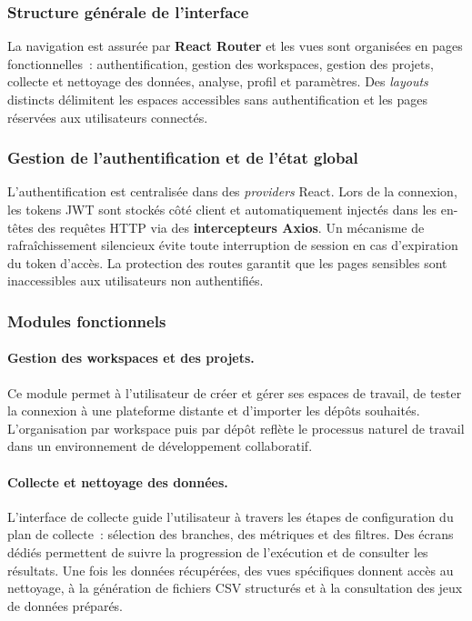 \subsubsection{Structure générale de l'interface}

La navigation est assurée par \textbf{React Router} et les vues sont organisées en pages
fonctionnelles~: authentification, gestion des workspaces, gestion des projets, collecte et
nettoyage des données, analyse, profil et paramètres. Des \textit{layouts} distincts délimitent
les espaces accessibles sans authentification et les pages réservées aux utilisateurs connectés.

\subsubsection{Gestion de l'authentification et de l'état global}

L'authentification est centralisée dans des \textit{providers} React. Lors de la connexion, les
tokens JWT sont stockés côté client et automatiquement injectés dans les en-têtes des requêtes
HTTP via des \textbf{intercepteurs Axios}. Un mécanisme de rafraîchissement silencieux évite toute
interruption de session en cas d'expiration du token d'accès. La protection des routes garantit
que les pages sensibles sont inaccessibles aux utilisateurs non authentifiés.

\subsubsection{Modules fonctionnels}

\paragraph{Gestion des workspaces et des projets.} Ce module permet à l'utilisateur de créer et
gérer ses espaces de travail, de tester la connexion à une plateforme distante et d'importer les
dépôts souhaités. L'organisation par workspace puis par dépôt reflète le processus naturel de
travail dans un environnement de développement collaboratif.

\paragraph{Collecte et nettoyage des données.} L'interface de collecte guide l'utilisateur à
travers les étapes de configuration du plan de collecte~: sélection des branches, des métriques
et des filtres. Des écrans dédiés permettent de suivre la progression de l'exécution et de
consulter les résultats. Une fois les données récupérées, des vues spécifiques donnent accès au
nettoyage, à la génération de fichiers CSV structurés et à la consultation des jeux de données
préparés.

